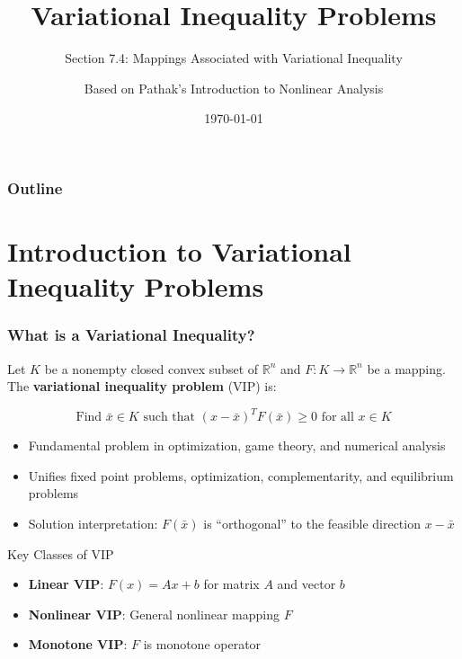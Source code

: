 \documentclass[aspectratio=169,10pt]{beamer}
\title{Variational Inequality Problems}
\subtitle{Section 7.4: Mappings Associated with Variational Inequality}
\author{Based on Pathak's Introduction to Nonlinear Analysis}
\institute{Fixed Point Theory \& Optimization Course}
\date{\today}
\begin{document}
\frame{\titlepage}


\begin{frame}
\frametitle{Outline}
\tableofcontents
\end{frame}


\section{Introduction to Variational Inequality Problems}

\begin{frame}
\frametitle{What is a Variational Inequality?}

\begin{definition}
Let $K$ be a nonempty closed convex subset of $\mathbb{R}^n$ and $F : K \to \mathbb{R}^n$ be a mapping.
The \textbf{variational inequality problem} (VIP) is:

\[
\boxed{\text{Find } \bar{x} \in K \text{ such that } (x - \bar{x})^T F(\bar{x}) \geq 0 \text{ for all } x \in K}
\]
\end{definition}

\vspace{0.3cm}

\begin{itemize}
    \item Fundamental problem in optimization, game theory, and numerical analysis
    \item Unifies fixed point problems, optimization, complementarity, and equilibrium problems
    \item Solution interpretation: $F(\bar{x})$ is ``orthogonal'' to the feasible direction $x - \bar{x}$
\end{itemize}

\vspace{0.3cm}

\begin{block}{Key Classes of VIP}
\begin{itemize}
    \item \textbf{Linear VIP}: $F(x) = Ax + b$ for matrix $A$ and vector $b$
    \item \textbf{Nonlinear VIP}: General nonlinear mapping $F$
    \item \textbf{Monotone VIP}: $F$ is monotone operator
\end{itemize}
\end{block}

\end{frame}
\end{document}
